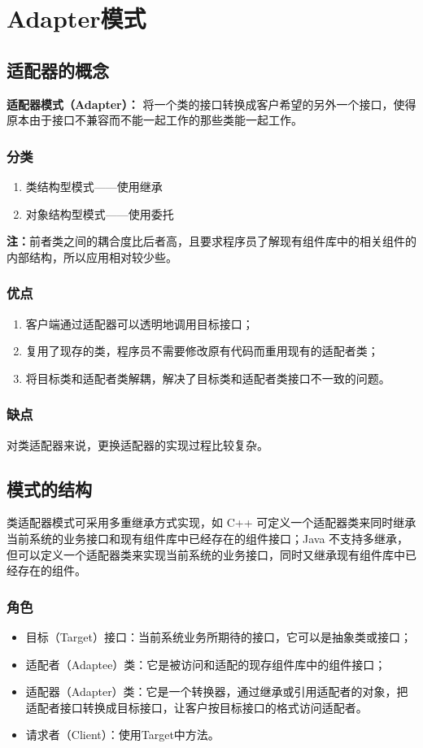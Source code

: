 \chapter{Adapter模式}
\section{适配器的概念}
\noindent\textbf{ 适配器模式（Adapter）：}
将一个类的接口转换成客户希望的另外一个接口，使得原本由于接口不兼容而不能一起工作的那些类能一起工作。
\subsection{分类}
\begin{enumerate}
	\item 类结构型模式——使用继承
	\item 对象结构型模式——使用委托
\end{enumerate}
\textbf{注：}前者类之间的耦合度比后者高，且要求程序员了解现有组件库中的相关组件的内部结构，所以应用相对较少些。
\subsection{优点}
\begin{enumerate}
	\item 客户端通过适配器可以透明地调用目标接口；
	\item 复用了现存的类，程序员不需要修改原有代码而重用现有的适配者类；
	\item 将目标类和适配者类解耦，解决了目标类和适配者类接口不一致的问题。
\end{enumerate}
\subsection{缺点}
对类适配器来说，更换适配器的实现过程比较复杂。
\section{模式的结构}
类适配器模式可采用多重继承方式实现，如 C++ 可定义一个适配器类来同时继承当前系统的业务接口和现有组件库中已经存在的组件接口；Java 不支持多继承，但可以定义一个适配器类来实现当前系统的业务接口，同时又继承现有组件库中已经存在的组件。
\subsection{角色}
\begin{itemize}
	\item 目标（Target）接口：当前系统业务所期待的接口，它可以是抽象类或接口；
	\item 适配者（Adaptee）类：它是被访问和适配的现存组件库中的组件接口；
	\item 适配器（Adapter）类：它是一个转换器，通过继承或引用适配者的对象，把适配者接口转换成目标接口，让客户按目标接口的格式访问适配者。
	\item 请求者（Client）：使用Target中方法。
\end{itemize}
